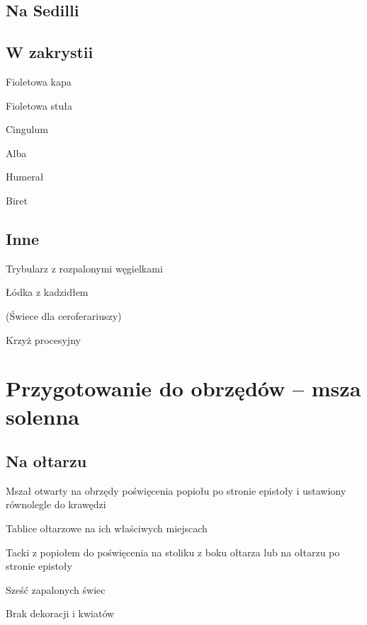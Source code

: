 \begin{paracol}{2}
	\subsection{Na Sedilli}

	\begin{itemize*}
		\item {\color{violet}{Fioletowy ornat}}
		\item {\color{violet}{Manipularz}}
	\end{itemize*}

	\subsection{W zakrystii}

	\begin{itemize*}
		\item {\color{violet} Fioletowa kapa}
		\item {\color{violet} Fioletowa stuła}
		\item Cingulum
		\item Alba
		\item Humerał
		\item Biret
	\end{itemize*}

	\subsection{Inne}

	\begin{itemize*}
		\item Trybularz z rozpalonymi węgielkami
		\item Łódka z kadzidłem
		\item (Świece dla ceroferariuszy)
		\item Krzyż procesyjny
	\end{itemize*}

	\switchcolumn

	\section{Przygotowanie do obrzędów -- msza solenna}

	\subsection{Na ołtarzu}

	\begin{itemize*}
		\item Mszał otwarty na obrzędy poświęcenia popiołu po stronie epistoły i ustawiony równolegle do krawędzi
		\item Tablice ołtarzowe na ich właściwych miejscach
		\item Tacki z popiołem do poświęcenia na stoliku z boku ołtarza lub na ołtarzu po stronie epistoły
		\item Sześć zapalonych świec
		\item Brak dekoracji i kwiatów
	\end{itemize*}


\end{paracol}
